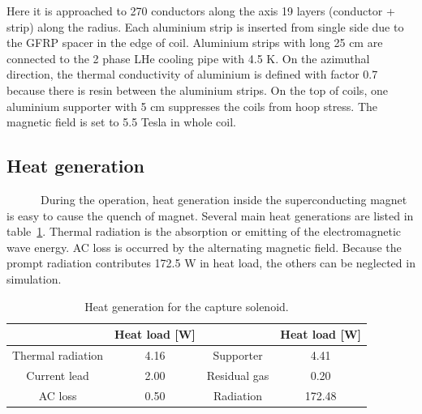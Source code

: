 Here it is approached to 270 conductors along the axis 19 layers (conductor + strip) along the radius.
Each aluminium strip is inserted from single side due to the GFRP spacer in the edge of coil.
Aluminium strips with long 25 cm are connected to the 2 phase LHe cooling pipe with 4.5 K.
On the azimuthal direction, the thermal conductivity of aluminium is defined with factor 0.7 because there is resin between the aluminium strips.
On the top of coils, one aluminium supporter with 5 cm suppresses the coils from hoop stress.
The magnetic field is set to 5.5 Tesla in whole coil.

 
 \subsection{Heat generation}
~~~~~~During the operation, heat generation inside the superconducting magnet is easy to cause the quench of magnet.
Several main heat generations are listed in table~\ref{theat}. 
Thermal radiation is the absorption or emitting of the electromagnetic wave energy.
AC loss is occurred by the alternating magnetic field.
Because the prompt radiation contributes 172.5 W in heat load, the others can be neglected in simulation.
 \begin{table}[H]
  \centering
  \begin{tabular}{cccc} \hline \hline
    & Heat load [W] & & Heat load [W] \\ \hline
	Thermal radiation & 4.16 & Supporter & 4.41 \\
	Current lead & 2.00 & Residual gas & 0.20 \\
	AC loss & 0.50 & Radiation & 172.48 \\ \hline \hline
  \end{tabular}
  \caption{Heat generation for the capture solenoid.}
  \label{theat}
 \end{table}
